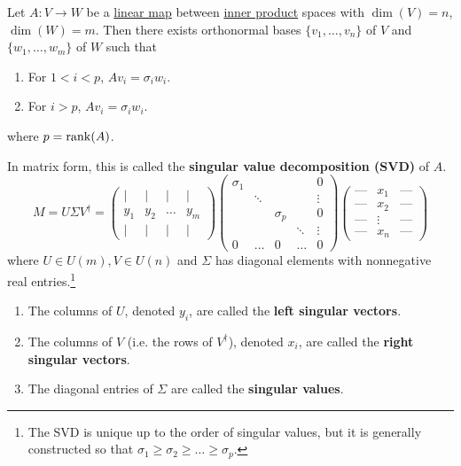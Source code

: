   \begin{theorem}
    \label{thm:singular-value-decomposition}
		Let $A: V \to W$ be a \hyperref[def:linear_map]{linear map} between \hyperref[def:inner-product]{inner product} spaces with $\dim(V) = n$, $\dim(W) = m$. Then there exists orthonormal bases $\{v_1, \ldots, v_n\}$ of $V$ and $\{w_1, \ldots, w_m\}$ of $W$ such that 
		\begin{enumerate}
		  \item For $1 < i < p$, $A v_i = \sigma_i w_i$. 
			\item For $i > p$, $A v_i = \sigma_i w_i$. 
		\end{enumerate}
		where $p = \operatorname{rank}(A)$. 

		In matrix form, this is called the \textbf{singular value decomposition (SVD)} of $A$. 
    \begin{equation}
      M = U \Sigma V^\dagger = \begin{pmatrix}
       \vert & \vert & \vert & \vert\\
      y_1 & y_2 & \ldots & y_m \\
      \vert & \vert & \vert & \vert
      \end{pmatrix}\begin{pmatrix}
      \sigma_1 & & & &0\\
      &\ddots &&& \vdots \\
      & & \sigma_p & & 0\\
      & & & \ddots &\vdots \\
      0 & \ldots &0& \ldots &0
      \end{pmatrix} \begin{pmatrix}
      \text{---}&x_1&\text{---} \\
      \text{---}&x_2&\text{---} \\
      \text{---}&\vdots&\text{---} \\
      \text{---}&x_n&\text{---}
      \end{pmatrix}
    \end{equation}
		where $U \in U(m), V \in U(n)$ and $\Sigma$ has diagonal elements with nonnegative real entries.\footnote{The SVD is unique up to the order of singular values, but it is generally constructed so that $\sigma_1 \geq \sigma_2 \geq \ldots \geq \sigma_p$.}
		\begin{enumerate}
		  \item The columns of $U$, denoted $y_i$, are called the \textbf{left singular vectors}. 
			\item The columns of $V$ (i.e. the rows of $V^\dagger$), denoted $x_i$, are called the \textbf{right singular vectors}. 
			\item The diagonal entries of $\Sigma$ are called the \textbf{singular values}. 
		\end{enumerate}
  \end{theorem}
